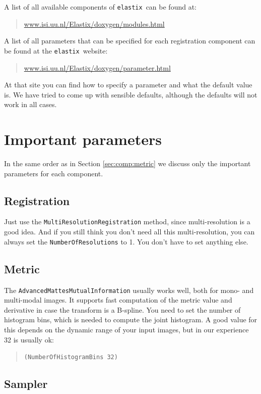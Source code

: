 \documentclass[]{report}
\newcommand{\elastix}{\texttt{elastix}}
\begin{document}
A list of all available components of \elastix\ can be found at:
\begin{quote}
\url{www.isi.uu.nl/Elastix/doxygen/modules.html}
\end{quote}
A list of all parameters that can be specified for each registration
component can be found at the \elastix\ website:
\begin{quote}
\url{www.isi.uu.nl/Elastix/doxygen/parameter.html}
\end{quote}
At that site you can find how to specify a parameter and what the
default value is. We have tried to come up with sensible defaults,
although the defaults will not work in all cases.


\section{Important parameters}\label{sec:Tutorial:importantparam}

In the same order as in Section \ref{sec:comp:metric} we discuss only
the important parameters for each component.

\subsection{Registration}

Just use the \texttt{MultiResolutionRegistration} method, since
multi-resolution is a good idea. And if you still think you don't
need all this multi-resolution, you can always set the
\texttt{NumberOfResolutions} to 1. You don't have to set anything
else.

\subsection{Metric}

The \texttt{AdvancedMattesMutualInformation} usually works well, both
for mono- and multi-modal images. It supports fast computation of the
metric value and derivative in case the transform is a B-spline. You
need to set the number of histogram bins, which is needed to compute
the joint histogram. A good value for this depends on the dynamic
range of your input images, but in our experience 32 is usually ok:
\begin{quote}
\texttt{(NumberOfHistogramBins 32)}
\end{quote}

\subsection{Sampler}
\end{document}
